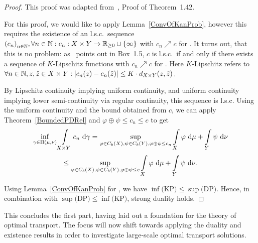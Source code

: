 \begin{proof}
	This proof was adapted from~\cite{San2015}, Proof of Theorem~1.42.

	For this proof, we would like to apply Lemma~\ref{ConvOfKanProb}, however this requires the existence of an l.s.c.\ sequence ${(c_n)}_{\NinN}, \forall \NinN: \map[c_n]{X \times Y}{\RZero \cup \{ \infty \}}$ with $c_n \nearrow c$ for \Ninf. It turns out, that this is no problem: as~\cite{San2015} points out in Box~1.5, $c$ is l.s.c.\ if and only if there exists a sequence of $K$-Lipschitz functions with $c_n \nearrow c$ for \Ninf. Here $K$-Lipschitz refers to $\forall \NinN{}, z, \hat{z} \in X \times Y: \vert c_n(z) - c_n(\hat{z}) \vert \le K \cdot d_{X \times Y}(z, \hat{z})$.

	By Lipschitz continuity implying uniform continuity, and uniform continuity implying lower semi-continuity via regular continuity, this sequence is l.s.c. Using the uniform continuity and the bound obtained from $c$, we can apply Theorem~\ref{BoundedPDRel} and $\varphi \oplus \psi \le c_n \le c$ to get
	\[ \inf\limits_{\gamma \in \TP{\mu}{\nu}} \int\limits_{X \times Y} c_n~\D[\gamma] = \sup\limits_{\varphi \in \CF[b]{X}, \psi \in \CF[b]{Y}, \varphi \oplus \psi \le c_n} \int\limits_X \varphi~\D + \int\limits_Y \psi~\D[\nu] \]
	\[ \le \sup\limits_{\varphi \in \CF[b]{X}, \psi \in \CF[b]{Y}, \varphi \oplus \psi \le c} \int\limits_X \varphi~\D + \int\limits_Y \psi~\D[\nu]. \]

	Using Lemma~\ref{ConvOfKanProb} for \Ninf, we have $\inf \text{(KP)} \le \sup \text{(DP)}$. Hence, in combination with $\sup \text{(DP)} \le \inf \text{(KP)}$, strong duality holds.
\end{proof}

This concludes the first part, having laid out a foundation for the theory of optimal transport. The focus will now shift towards applying the duality and existence results in order to investigate large-scale optimal transport solutions.